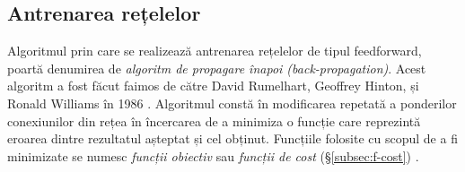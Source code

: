 \subsection{Antrenarea rețelelor}\label{subsec:antrenare}
Algoritmul prin care se realizează antrenarea rețelelor de tipul feedforward, poartă denumirea de \textit{algoritm de propagare înapoi (back-propagation)}. Acest algoritm a fost făcut faimos de către David Rumelhart, Geoffrey Hinton, și Ronald Williams în 1986 \cite{rumelhart1986}. Algoritmul constă în modificarea repetată a ponderilor conexiunilor din rețea în încercarea de a minimiza o funcție care reprezintă eroarea dintre rezultatul așteptat și cel obținut. Funcțiile folosite cu scopul de a fi minimizate se numesc \textit{funcții obiectiv} sau \textit{funcții de cost} (\S\ref{subsec:f-cost}) \cite{neuralnetbook:2015}.

